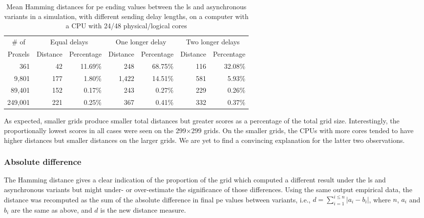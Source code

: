 \begin{table}
\centering
\begin{tabular}{@{}r|rr|rr|rr@{}}
\toprule
\multicolumn{1}{c|}{\# of}   & \multicolumn{2}{c|}{Equal delays} & \multicolumn{2}{c|}{One longer delay} & \multicolumn{2}{c}{Two longer delays} \\ \cmidrule(l){2-7} 
\multicolumn{1}{c|}{Proxels} & Distance     & Percentage     & Distance      & Percentage      & Distance      & Percentage      \\ \midrule
361  & 42  & 11.69\% & 248  & 68.75\% & 116  & 32.08\% \\
9,801  & 177  & 1.80\% & 1,422  & 14.51\% & 581  & 5.93\% \\
89,401  & 152  & 0.17\% & 243  & 0.27\% & 229  & 0.26\% \\
249,001  & 221  & 0.25\% & 367  & 0.41\% & 332  & 0.37\% \\ \bottomrule
\end{tabular}%
\caption[Mean Hamming distances for \acrshort{pe} ending values between the \gls{ls} and asynchronous variants on a 48-core CPU]{Mean Hamming distances for \gls{pe} ending values between the \gls{ls} and asynchronous variants in a simulation, with different sending delay lengths, on a computer with a CPU with 24/48 physical/logical cores}
\label{tab:nmp:hamming48cores}
\end{table}

As expected, smaller grids produce smaller total distances but greater scores as a percentage of the total grid size.  Interestingly, the proportionally lowest scores in all cases were seen on the 299×299 grids.  On the smaller grids, the CPUs with more cores tended to have higher distances but smaller distances on the larger grids.  We are yet to find a convincing explanation for the latter two observations.

\subsubsection{Absolute difference}
The Hamming distance gives a clear indication of the proportion of the grid which computed a different result under the \gls{ls} and asynchronous variants but might under- or over-estimate the significance of those differences.  Using the same output empirical data, the distance was recomputed as the sum of the absolute difference in final \gls{pe} values between variants, i.e., \( d = \sum_{i = 1}^{i \leq n} |a_i - b_i| \), where \(n\), \(a_i\) and \(b_i\) are the same as above, and \(d\) is the new distance measure.


